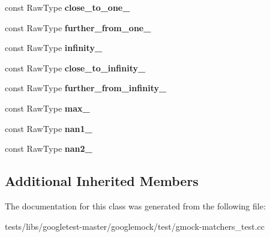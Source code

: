 \begin{DoxyCompactItemize}
const Raw\+Type {\bfseries close\+\_\+to\+\_\+one\+\_\+}
\item 
\mbox{\label{classtesting_1_1gmock__matchers__test_1_1FloatingPointTest_a049ba2d5d371e8aea6ada1ab5312b1bb}} 
const Raw\+Type {\bfseries further\+\_\+from\+\_\+one\+\_\+}
\item 
\mbox{\label{classtesting_1_1gmock__matchers__test_1_1FloatingPointTest_a21d8a019a6365ddff80e301a6163f43f}} 
const Raw\+Type {\bfseries infinity\+\_\+}
\item 
\mbox{\label{classtesting_1_1gmock__matchers__test_1_1FloatingPointTest_a6fc8ac2030f4883e1c84da3a21bbb7c3}} 
const Raw\+Type {\bfseries close\+\_\+to\+\_\+infinity\+\_\+}
\item 
\mbox{\label{classtesting_1_1gmock__matchers__test_1_1FloatingPointTest_a603ab51280ecb1c4147c2660a7a90728}} 
const Raw\+Type {\bfseries further\+\_\+from\+\_\+infinity\+\_\+}
\item 
\mbox{\label{classtesting_1_1gmock__matchers__test_1_1FloatingPointTest_a17b9dd56136b64fa7210bfe024d88c30}} 
const Raw\+Type {\bfseries max\+\_\+}
\item 
\mbox{\label{classtesting_1_1gmock__matchers__test_1_1FloatingPointTest_a0d2544956414eac21d4519fe600e4603}} 
const Raw\+Type {\bfseries nan1\+\_\+}
\item 
\mbox{\label{classtesting_1_1gmock__matchers__test_1_1FloatingPointTest_a4af3b3e53a06d271479ff30f5d5ee155}} 
const Raw\+Type {\bfseries nan2\+\_\+}
\end{DoxyCompactItemize}
\subsection*{Additional Inherited Members}


The documentation for this class was generated from the following file\+:\begin{DoxyCompactItemize}
\item 
tests/libs/googletest-\/master/googlemock/test/gmock-\/matchers\+\_\+test.\+cc\end{DoxyCompactItemize}
